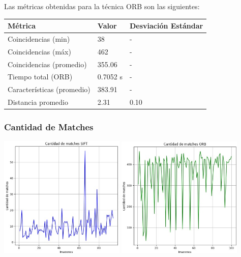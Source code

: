 \documentclass[unnumsec,webpdf,modern,large]{mam-authoring-template}
\theoremstyle{thmstyleone}%
\theoremstyle{thmstyletwo}%
\theoremstyle{thmstylethree}%
\begin{document}
Las métricas obtenidas para la técnica ORB son las siguientes:

\begin{center}
    \begin{tabular}{| m{7em} | m{1.5cm} | m{1.5cm} |}
    \hline 
    \textbf{Métrica} & \textbf{Valor} & \textbf{Desviación Estándar} \\
    \hline 
    Coincidencias (min) & 38 & - \\
    \hline 
    Coincidencias (máx) & 462 & - \\
    \hline 
    Coincidencias (promedio) & 355.06 & - \\
    \hline 
    Tiempo total (ORB) & 0.7052 s & - \\
    \hline 
    Características (promedio) & 383.91 & - \\
    \hline 
    Distancia promedio & 2.31 & 0.10 \\
    \hline 
    \end{tabular}
\end{center}


\subsubsection{Cantidad de Matches}

\includegraphics[width=6cm]{2.1.png}\newline
\includegraphics[width=6cm]{2.1.1.png}
\end{document}
